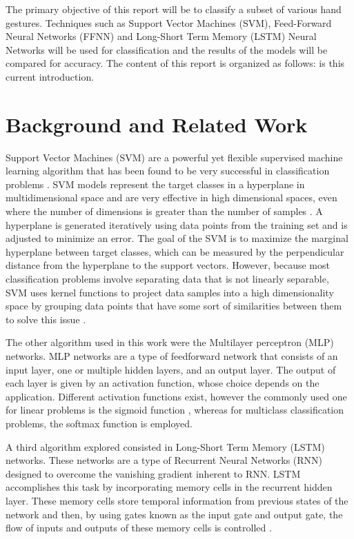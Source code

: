 \documentclass[journal]{IEEEtran}
\begin{document}
The primary objective of this report will be to classify a subset of various hand gestures. Techniques such as Support Vector Machines (SVM), Feed-Forward Neural Networks (FFNN) and Long-Short Term Memory (LSTM) Neural Networks will be used for classification and the results of the models will be compared for accuracy. The content of this report is organized as follows:  is this current introduction. 


\section{Background and Related Work}
\label{sec:back}
Support Vector Machines (SVM) are a powerful yet flexible supervised machine learning algorithm that has been found to be very successful in classification problems \cite{hearst1998}. SVM models represent the target classes in a hyperplane in multidimensional space and are very effective in high dimensional spaces, even where the number of dimensions is greater than the number of samples \cite{scikit-learn}. A hyperplane is generated iteratively using data points from the training set and is adjusted to minimize an error. The goal of the SVM is to maximize the marginal hyperplane between target classes, which can be measured by the perpendicular distance from the hyperplane to the support vectors. However, because most classification problems involve separating data that is not linearly separable, SVM uses kernel functions to project data samples into a high dimensionality space by grouping data points that have some sort of similarities between them to solve this issue \cite{hearst1998}. 

The other algorithm used in this work were the Multilayer perceptron (MLP) networks. MLP networks are a type of feedforward network that consists of an input layer, one or multiple hidden layers, and an output layer. The output of each layer is given by an activation function, whose choice depends on the application. Different activation functions exist, however the commonly used one for linear problems is the sigmoid function \cite{bishop2006}, whereas for multiclass classification problems, the softmax function is employed.

A third algorithm explored consisted in Long-Short Term Memory (LSTM) networks. These networks are a type of Recurrent Neural Networks (RNN) designed to overcome the vanishing gradient inherent to RNN. LSTM accomplishes this task by incorporating memory cells in the recurrent hidden layer. These memory cells store temporal information from previous states of the network and then, by using gates known as the input gate and output gate, the flow of inputs and outputs of these memory cells is controlled \cite{hochreiter1997}.
\end{document}
